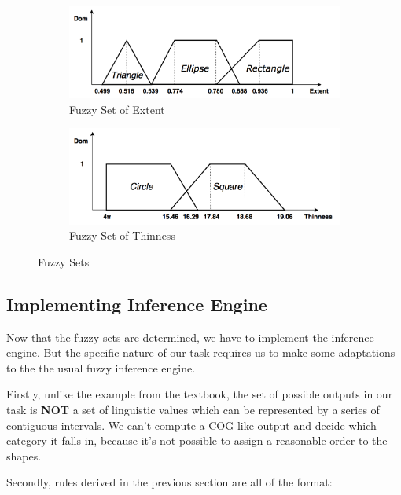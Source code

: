 \begin{figure}

\begin{subfigure}[b]{\columnwidth}
\includegraphics[width=\columnwidth]{Figure_3_Fuzzy_Sets_1.png}
\caption{Fuzzy Set of Extent}\end{subfigure}

\begin{subfigure}[b]{\columnwidth}
\includegraphics[width=\columnwidth]{Figure_4_Fuzzy_Sets_2.png}
\caption{Fuzzy Set of Thinness}
\end{subfigure}

\caption{Fuzzy Sets}

\end{figure}

\subsection{Implementing Inference Engine}

Now that the fuzzy sets are determined, we have to implement the inference engine. But the specific nature of our task requires us to make some adaptations to the the usual fuzzy inference engine.

Firstly, unlike the example from the textbook, the set of possible outputs in our task is \textbf{NOT} a set of linguistic values which can be represented by a series of contiguous intervals. We can't compute a COG-like output and decide which category it falls in, because it's not possible to assign a reasonable order to the shapes.

Secondly, rules derived in the previous section are all of the format:

